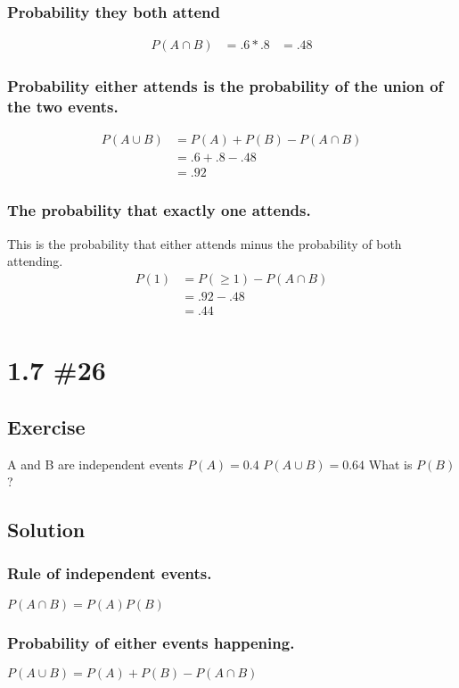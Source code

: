 \documentclass[12pt]{article}
\begin{document}
\subsubsection{Probability they both attend}

\begin{align*}
P(A \cap B) & = .6 * .8
            & = .48
\end{align*}

\subsubsection{Probability either attends is the probability of the union of the two events.}
\begin{align*}
P(A \cup B) & = P(A) + P(B) - P(A \cap B) \\
            & = .6 + .8 - .48 \\
            & = .92
\end{align*}

\subsubsection{The probability that exactly one attends.}
This is the probability that either attends minus the probability of both attending.
\begin{align*}
P(1) & = P(\geq 1)-P(A \cap B) \\
     & = .92-.48 \\
     & = .44
\end{align*}

\section{1.7 \#26}
\subsection{Exercise}
A and B are independent events
$P(A) = 0.4$
$P(A \cup B) = 0.64$
What is $P(B)$?

\subsection{Solution}
\subsubsection{Rule of independent events.}
$P(A \cap B) = P(A)P(B)$

\subsubsection{Probability of either events happening.}
$P(A \cup B) = P(A) + P(B) - P(A \cap B)$
\end{document}
